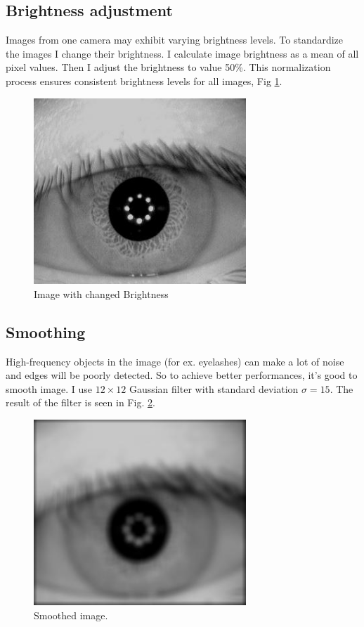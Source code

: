 \documentclass{article}
\begin{document}
\newpage

\subsection{Brightness adjustment}
Images from one camera may exhibit varying brightness levels. 
To standardize the images I change their brightness.
I calculate image brightness as a mean of all pixel values. Then I adjust the brightness to value 50\%.
This normalization process ensures consistent brightness levels for all images, Fig \ref{ImgAdj}.

\begin{figure}[ht!]
  \centering
  \includegraphics[width=80mm]{Resources/eye-ImgAdj.jpg}
  \caption{Image with changed Brightness}
  \label{ImgAdj}
\end{figure}


\subsection{Smoothing}
High-frequency objects in the image (for ex. eyelashes) can make a lot of noise and edges will be poorly detected.
So to achieve better performances, it's good to smooth image. I use \(12 \times 12 \) Gaussian filter with standard deviation \(\sigma = 15\).
The result of the filter is seen in Fig. \ref{ImgSmooth}.

\begin{figure}[ht!]
  \centering
  \includegraphics[width=80mm]{Resources/eye-ImgSmooth.jpg}
  \caption{Smoothed image.}
  \label{ImgSmooth}
\end{figure}
\end{document}
